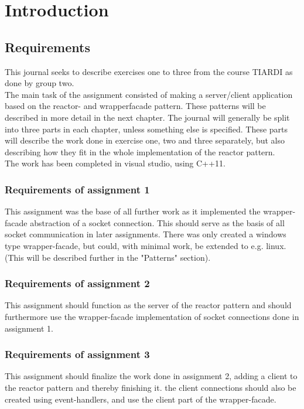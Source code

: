 \documentclass[Main]{subfiles}
\begin{document}
\chapter{Introduction}
\section{Requirements}
This journal seeks to describe exercises one to three from the course TIARDI as done by group two. \\
The main task of the assignment consisted of making a server/client application based on the reactor- and wrapperfacade pattern. These patterns will be described in more detail in the next chapter. The journal will generally be split into three parts in each chapter, unless something else is specified. These parts will describe the work done in exercise one, two and three separately, but also describing how they fit in the whole implementation of the reactor pattern. \\
The work has been completed in visual studio, using C++11.

\subsection{Requirements of assignment 1}
This assignment was the base of all further work as it implemented the wrapper-facade abstraction of a socket connection. This should serve as the basis of all socket communication in later assignments. There was only created a windows type wrapper-facade, but could, with minimal work, be extended to e.g. linux. (This will be described further in the "Patterns" section).

\subsection{Requirements of assignment 2}
This assignment should function as the server of the reactor pattern and should furthermore use the wrapper-facade implementation of socket connections done in assignment 1. 

\subsection{Requirements of assignment 3}
This assignment should finalize the work done in assignment 2, adding a client to the reactor pattern and thereby finishing it. the client connections should also be created using event-handlers, and use the client part of the wrapper-facade.


\end{document}
